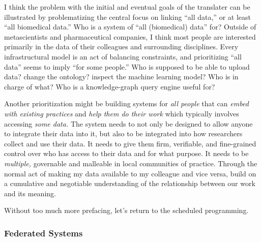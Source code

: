 \documentclass[10pt]{article}
\begin{document}
\begin{multicols}{2}
I think the problem with the initial and eventual goals of the
translater can be illustrated by problematizing the central focus on
linking ``all data,'' or at least ``all biomedical data.'' Who is a
system of ``all (biomedical) data'' for? Outside of metascientists and
pharmaceutical companies, I think most people are interested primarily
in the data of their colleagues and surrounding disciplines. Every
infrastructural model is an act of balancing constraints, and
prioritizing ``all data'' seems to imply ``for some people.'' Who is
supposed to be able to upload data? change the ontology? inspect the
machine learning model? Who is in charge of what? Who is a
knowledge-graph query engine useful for?

Another prioritization might be building systems for \emph{all people}
that can \emph{embed with existing practices} and \emph{help them do
their work} which typically involves accessing \emph{some data.} The
system needs to not only be designed to allow anyone to integrate their
data into it, but also to be integrated into how researchers collect and
use their data. It needs to give them firm, verifiable, and fine-grained
control over who has access to their data and for what purpose. It needs
to be \emph{multiple,} governable and malleable in local communities of
practice. Through the normal act of making my data available to my
colleague and vice versa, build on a cumulative and negotiable
understanding of the relationship between our work and its meaning.

Without too much more prefacing, let's return to the scheduled
programming. 
\end{multicols}


\hypertarget{federated-systems}{%
\subsubsection{Federated Systems}\label{federated-systems}}
\end{document}
